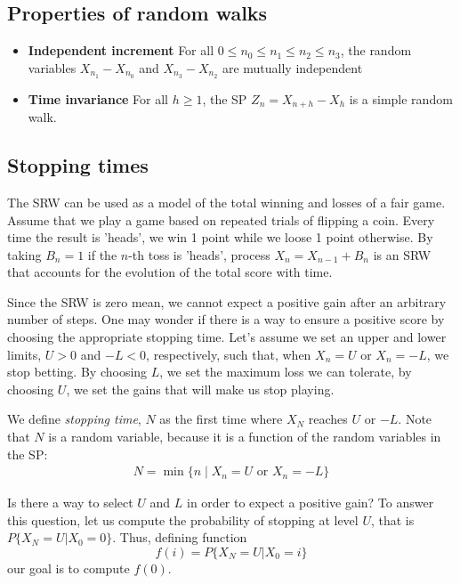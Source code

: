 \subsection{Properties of random walks}

\begin{itemize}
\item \textbf{Independent increment} For all $0 \le n_0 \le n_1 \le n_2 \le n_3$, the random variables $X_{n_1} - X_{n_0}$ and $X_{n_3} - X_{n_2}$ are mutually independent
\item \textbf{Time invariance} For all $h \ge 1$, the SP $Z_n = X_{n+h} - X_h$ is a simple random walk.
\end{itemize}

\subsection{Stopping times}

The SRW can be used as a model of the total winning and losses of a fair game. Assume that we play a game based on repeated trials of flipping a coin. Every time the result is 'heads', we win 1 point while we loose 1 point otherwise. By taking $B_n=1$ if the $n$-th toss is 'heads', process $X_n=X_{n-1}+B_n$ is an SRW that accounts for the evolution of the total score with time.

Since the SRW is zero mean, we cannot expect a positive gain after an arbitrary number of steps. One may wonder if there is a way to ensure a positive score by choosing the appropriate stopping time. Let's assume we set an upper and lower limits, $U>0$ and $-L<0$, respectively, such that, when $X_n=U$ or $X_n=-L$, we stop betting. By choosing $L$, we set the maximum loss we can tolerate, by choosing $U$, we set the gains that will make us stop playing.

We define {\em stopping time}, $N$ as the first time where $X_N$ reaches $U$ or $-L$. Note that $N$ is a random variable, because it is a function of the random variables in the SP:
\begin{align}
N = \min\{n \mid X_n = U \text{ or } X_n = -L \} 
\end{align}

Is there a way to select $U$ and $L$ in order to expect a positive gain? To answer this question, let us compute the probability of stopping at level $U$, that is $P\{X_N=U|X_0=0\}$. Thus, defining function
$$
f(i) = P\{X_N = U | X_0 = i\}
$$
our goal is to compute $f(0)$. 

